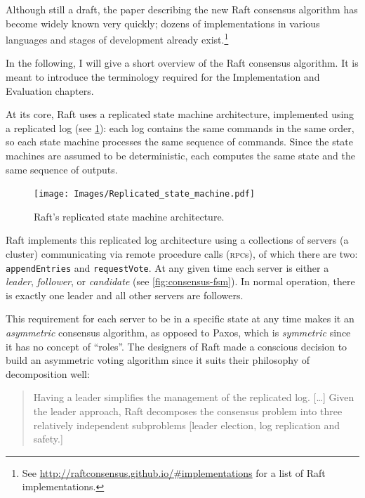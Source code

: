 \documentclass[12pt,chapterprefix=true,toc=bibliography,numbers=noendperiod,
               footnotes=multiple,twoside]{scrreprt}
\begin{document}
Although still a draft, the paper describing the new Raft consensus algorithm \autocite{raft} has become widely known very quickly; dozens of implementations in various languages and stages of development already exist.\footnote{See \url{http://raftconsensus.github.io/\#implementations} for a list of Raft implementations.}

In the following, I will give a short overview of the Raft consensus algorithm. It is meant to introduce the terminology required for the Implementation and Evaluation chapters.

At its core, Raft uses a replicated state machine architecture, implemented using a replicated log (see \cref{fig:replicated-state-machine}): each log contains the same commands in the same order, so each state machine processes the same sequence of commands. Since the state machines are assumed to be deterministic, each computes the same state and the same sequence of outputs.

\begin{figure}[h]
    \centering
    \texttt{[image: Images/Replicated\_state\_machine.pdf]}
    \caption{Raft's replicated state machine architecture.
        \protect{}
    }
    \label{fig:replicated-state-machine}
\end{figure}

Raft implements this replicated log architecture using a collections of servers (a cluster) communicating via remote procedure calls (\textsc{rpc}s), of which there are two: \texttt{appendEntries} and \texttt{requestVote}. At any given time each server is either a \emph{leader}, \emph{follower}, or \emph{candidate} (see \cref{fig:consensus-fsm}). In normal operation, there is exactly one leader and all other servers are followers.

This requirement for each server to be in a specific state at any time makes it an \emph{asymmetric} consensus algorithm, as opposed to Paxos, which is \emph{symmetric} since it has no concept of \enquote{roles}. The designers of Raft made a conscious decision to build an asymmetric voting algorithm since it suits their philosophy of decomposition well:

\begin{quote}
    Having a leader simplifies the management of the replicated log. [\dots{}] Given the leader approach, Raft decomposes the consensus problem into three relatively independent subproblems [leader election, log replication and safety.]
\end{quote}
\end{document}
